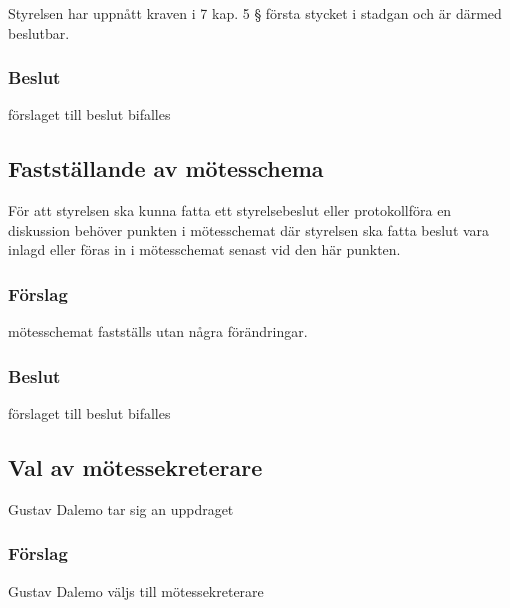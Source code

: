 \documentclass[protokoll]{dvd}
\begin{document}
\begin{attsatser}
    \item Styrelsen har uppnått kraven i 7 kap. 5 § första stycket i stadgan och är därmed beslutbar.
\end{attsatser}
\subsubsection*{Beslut}
\begin{attsatser}
    \item förslaget till beslut bifalles
\end{attsatser}


\subsection{Fastställande av mötesschema}

För att styrelsen ska kunna fatta ett styrelsebeslut eller protokollföra en diskussion behöver punkten i mötesschemat där styrelsen ska fatta beslut vara inlagd eller föras in i mötesschemat senast vid den här punkten.

\subsubsection*{Förslag}

\begin{attsatser}
    \item mötesschemat fastställs utan några förändringar.
\end{attsatser}
\subsubsection*{Beslut}
\begin{attsatser}
    \item förslaget till beslut bifalles
\end{attsatser}

\subsection{Val av mötessekreterare}
Gustav Dalemo tar sig an uppdraget
\subsubsection*{Förslag}
\begin{attsatser}
    \item Gustav Dalemo väljs till mötessekreterare
\end{attsatser}
\end{document}
